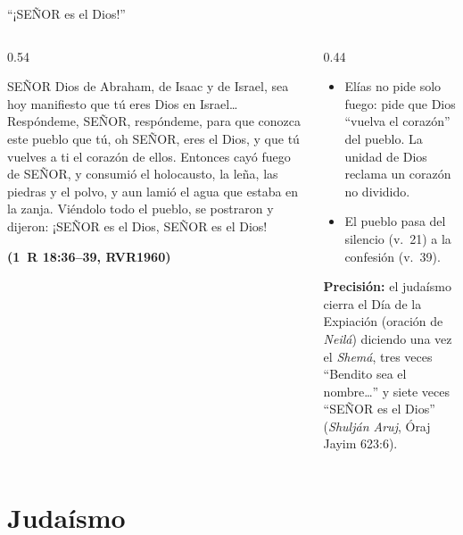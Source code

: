 \documentclass[hyperref={bookmarks=false},aspectratio=169]{beamer}
\newcommand{\SENOR}{S{\fontsize{0.78em}{1em}\selectfont EÑOR}}
\newcommand{\fuente}[1]{\par\hfill{\upshape\bfseries\footnotesize\textcolor{azul}{#1}}}
\newcommand{\precision}[1]{{\footnotesize\color{gris}\textbf{Precisión:} #1}}
\begin{document}
\begin{frame}{``¡\SENOR{} es el Dios!''}
\begin{columns}[t,onlytextwidth]
\begin{column}{0.54\textwidth}
\begin{cita}[fontupper=\scriptsize\itshape]\SENOR{} Dios de Abraham, de Isaac y de Israel, sea hoy manifiesto que tú eres Dios en Israel\ldots{} Respóndeme, \SENOR, respóndeme, para que conozca este pueblo que tú, oh \SENOR, eres el Dios, y que tú vuelves a ti el corazón de ellos. Entonces cayó fuego de \SENOR, y consumió el holocausto, la leña, las piedras y el polvo, y aun lamió el agua que estaba en la zanja. Viéndolo todo el pueblo, se postraron y dijeron: ¡\SENOR{} es el Dios, \SENOR{} es el Dios!\fuente{(1~R 18:36--39, RVR1960)}\end{cita}
\end{column}
\begin{column}{0.44\textwidth}\small
\begin{itemize}
\item Elías no pide solo fuego: pide que Dios ``vuelva el corazón'' del pueblo. La unidad de Dios reclama un corazón no dividido.
\item El pueblo pasa del silencio (v.~21) a la confesión (v.~39).
\end{itemize}
\precision{el judaísmo cierra el Día de la Expiación (oración de \emph{Neilá}) diciendo una vez el \emph{Shemá}, tres veces ``Bendito sea el nombre\ldots'' y siete veces ``\SENOR{} es el Dios'' (\emph{Shulján Aruj}, Óraj Jayim 623:6).}
\end{column}
\end{columns}
\end{frame}

\section{Judaísmo}
\end{document}
